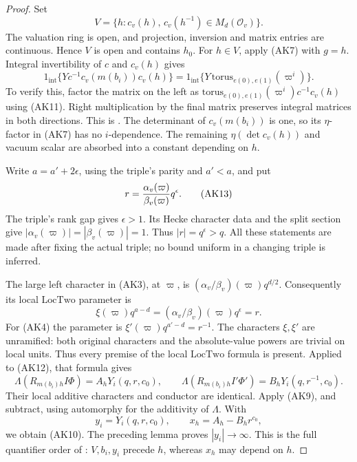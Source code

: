 \begin{proof}
Set
\[
 V=\{h:c_v(h),\,c_v(h^{-1})\in M_d(\mathcal O_v)\}.
\]
The valuation ring is open, and projection, inversion and matrix
entries are continuous. Hence \(V\) is open and contains \(h_0\).
For \(h\in V\), apply (AK7) with \(g=h\).
Integral invertibility of \(c\) and \(c_v(h)\) gives
\[
 1_{\mathrm{int}}\{Yc^{-1}c_v(m(b_i))c_v(h)\}
       =1_{\mathrm{int}}\{
                    Y\,\mathrm{torus}_{e(0),e(1)}(\varpi^i)\}.
 \tag{AK12}\label{eq:sr-source-key-two-vacuum-torus}
\]
To verify this, factor the matrix on the left as
\(\mathrm{torus}_{e(0),e(1)}(\varpi^i)c^{-1}c_v(h)\)
using (AK11).
Right multiplication by the final matrix preserves integral matrices
in both directions. This is .
The determinant of \(c_v(m(b_i))\) is one, so its \(\eta\)-factor
in (AK7) has no \(i\)-dependence.
The remaining \(\eta(\det c_v(h))\) and vacuum scalar are absorbed
into a constant depending on \(h\).

Write \(a=a'+2\epsilon\), using the triple's parity and \(a'<a\), and
put
\[
 r={\alpha_v(\varpi)\over\beta_v(\varpi)}q^\epsilon.
 \tag{AK13}\label{eq:sr-source-key-two-r}
\]
The triple's rank gap gives \(\epsilon>1\).
Its Hecke character data and the split section give
\(|\alpha_v(\varpi)|=|\beta_v(\varpi)|=1\).
Thus \(|r|=q^\epsilon>q\).
All these statements are made after fixing the actual triple;
no bound uniform in a changing triple is inferred.

The large left character in (AK3), at \(\varpi\), is
\((\alpha_v/\beta_v)(\varpi)q^{d/2}\).
Consequently its local \(\mathrm{LocTwo}\) parameter is
\[
                    \xi(\varpi)q^{a-d}
                       =(\alpha_v/\beta_v)(\varpi)q^\epsilon=r.
\]
For (AK4) the parameter is
\(\xi'(\varpi)q^{a'-d}=r^{-1}\).
The characters \(\xi,\xi'\) are unramified: both original
characters and the absolute-value powers are trivial on local units.
Thus every premise of the local \(\mathrm{LocTwo}\) formula is present.
Applied to (AK12), that formula gives
\[
 \Lambda(R_{m(b_i)h}I\Phi)=A_hY_i(q,r,c_0),\qquad
 \Lambda(R_{m(b_i)h}I'\Phi')=B_hY_i(q,r^{-1},c_0).
\]
Their local additive characters and conductor are identical.
Apply (AK9), and subtract, using automorphy for the additivity of
\(\Lambda\).
With
\[
             y_i=Y_i(q,r,c_0),\qquad
                         x_h=A_h-B_hr^{c_0},
\]
we obtain (AK10).
The preceding lemma proves \(|y_i|\to\infty\).
This is the full quantifier order of
: \(V,b_i,y_i\) precede \(h\),
whereas \(x_h\) may depend on \(h\).
\end{proof}

